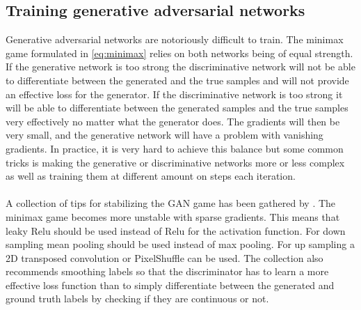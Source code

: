 \documentclass{kththesis}
\begin{document}
\subsection{Training generative adversarial networks}
Generative adversarial networks are notoriously difficult to train. The minimax game formulated in \ref{eq:minimax} relies on both networks being of equal strength. If the generative network is too strong the discriminative network will not be able to differentiate between the generated and the true samples and will not provide an effective loss for the generator. If the discriminative network is too strong it will be able to differentiate between the generated samples and the true samples very effectively no matter what the generator does. The gradients will then be very small, and the generative network will have a problem with vanishing gradients. In practice, it is very hard to achieve this balance but some common tricks is making the generative or discriminative networks more or less complex as well as training them at different amount on steps each iteration.\\
\\
A collection of tips for stabilizing the GAN game has been gathered by \parencite{chintala_ganhacks:_2018}.
The minimax game becomes more unstable with sparse gradients. This means that leaky Relu should be used instead of Relu for the activation function. For down sampling mean pooling should be used instead of max pooling. For up sampling a 2D transposed convolution or PixelShuffle \parencite{shi_real-time_2016} can be used. The collection also recommends smoothing labels so that the discriminator has to learn a more effective loss function than to simply differentiate between the generated and ground truth labels by checking if they are continuous or not.
\end{document}
